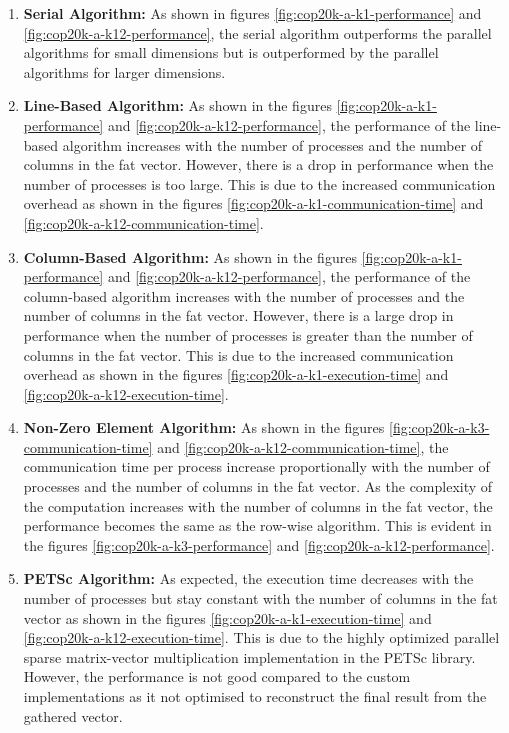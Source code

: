 \documentclass[12pt,oneside]{book} %
\begin{document}
\begin{enumerate}
    \item \textbf{Serial Algorithm:}
          As shown in figures \ref{fig:cop20k-a-k1-performance} and \ref{fig:cop20k-a-k12-performance}, the serial algorithm outperforms the parallel algorithms for small dimensions but is outperformed by the parallel algorithms for larger dimensions.
    \item \textbf{Line-Based Algorithm:}
          As shown in the figures \ref{fig:cop20k-a-k1-performance} and \ref{fig:cop20k-a-k12-performance}, the performance of the line-based algorithm increases with the number of processes and the number of columns in the fat vector. However, there is a drop in performance when the number of processes is too large. This is due to the increased communication overhead as shown in the figures \ref{fig:cop20k-a-k1-communication-time} and \ref{fig:cop20k-a-k12-communication-time}.

    \item \textbf{Column-Based Algorithm:}
          As shown in the figures \ref{fig:cop20k-a-k1-performance} and \ref{fig:cop20k-a-k12-performance}, the performance of the column-based algorithm increases with the number of processes and the number of columns in the fat vector. However, there is a large drop in performance when the number of processes is greater than the number of columns in the fat vector. This is due to the increased communication overhead as shown in the figures \ref{fig:cop20k-a-k1-execution-time} and \ref{fig:cop20k-a-k12-execution-time}.

    \item \textbf{Non-Zero Element Algorithm:}
          As shown in the figures \ref{fig:cop20k-a-k3-communication-time} and \ref{fig:cop20k-a-k12-communication-time}, the communication time per process increase proportionally with the number of processes and the number of columns in the fat vector. As the complexity of the computation increases with the number of columns in the fat vector, the performance becomes the same as the row-wise algorithm. This is evident in the figures \ref{fig:cop20k-a-k3-performance} and \ref{fig:cop20k-a-k12-performance}.

    \item \textbf{PETSc Algorithm:}
          As expected, the execution time decreases with the number of processes but stay constant with the number of columns in the fat vector as shown in the figures \ref{fig:cop20k-a-k1-execution-time} and \ref{fig:cop20k-a-k12-execution-time}. This is due to the highly optimized parallel sparse matrix-vector multiplication implementation in the PETSc library. However, the performance is not good compared to the custom implementations as it not optimised to reconstruct the final result from the gathered vector.
\end{enumerate}
\end{document}
